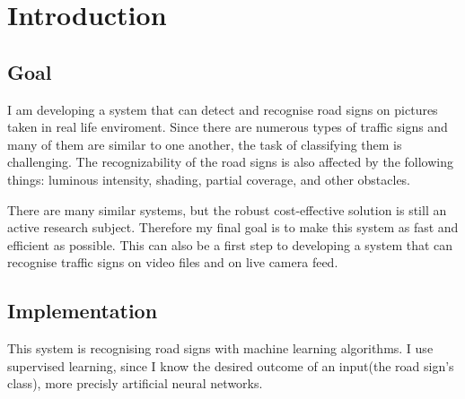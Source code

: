 \chapter{Introduction}\label{ch:INTRO}

\section{Goal}\label{sec:INTRO:goal}

I am developing a system that can detect and recognise road signs on pictures taken in real life enviroment. Since there are numerous types of traffic signs and many of them are similar to one another, the task of classifying them is challenging. The recognizability of the road signs is also affected by the following things: luminous intensity, shading, partial coverage, and other obstacles.

There are many similar systems, but the robust cost-effective solution is still an active research subject. Therefore my final goal is to make this system as fast and efficient as possible. This can also be a first step to developing a system that can recognise traffic signs on video files and on live camera feed.

\section{Implementation}\label{sec:INTRO:implement}

This system is recognising road signs with machine learning algorithms. I use supervised learning, since I know the desired outcome of an input(the road sign's class), more precisly artificial neural networks.